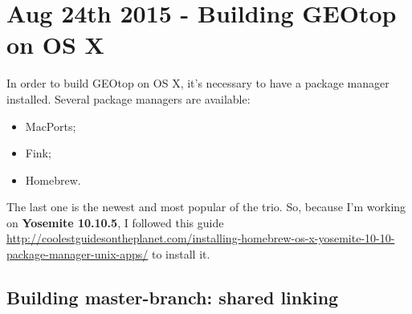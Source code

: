 \section{Aug 24th 2015 - Building GEOtop on OS X}\label{sec:20150824}

In order to build GEOtop on OS X, it's necessary to have a package manager installed. Several package managers are available:

\begin{itemize}
\item MacPorts;
\item Fink;
\item Homebrew.
\end{itemize}
The last one is the newest and most popular of the trio. So, because I'm working on \textbf{Yosemite 10.10.5}, I followed this guide \url{http://coolestguidesontheplanet.com/installing-homebrew-os-x-yosemite-10-10-package-manager-unix-apps/} to install it.

\subsection{Building master-branch: shared linking}

